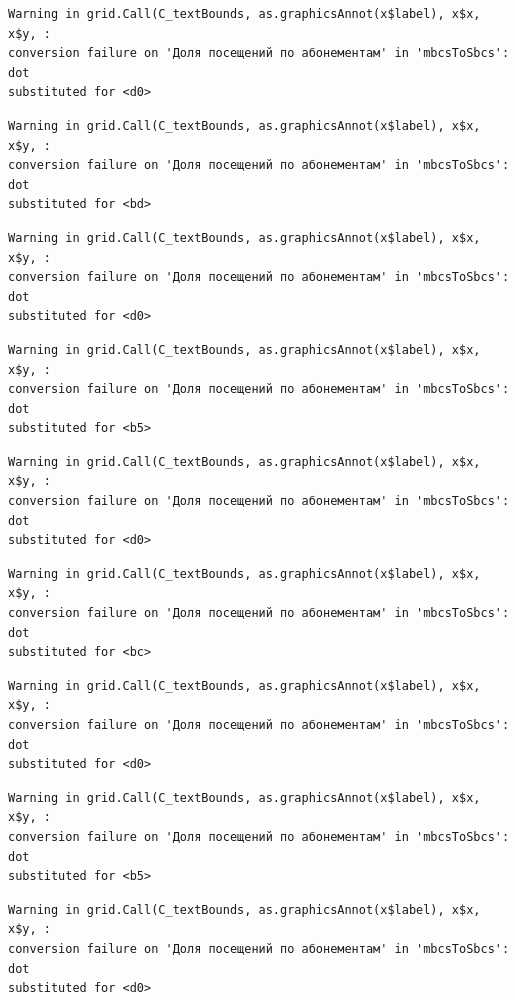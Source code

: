 \documentclass[
  letterpaper,
  DIV=11,
  numbers=noendperiod]{scrartcl}
\begin{document}
\begin{verbatim}
Warning in grid.Call(C_textBounds, as.graphicsAnnot(x$label), x$x, x$y, :
conversion failure on 'Доля посещений по абонементам' in 'mbcsToSbcs': dot
substituted for <d0>
\end{verbatim}

\begin{verbatim}
Warning in grid.Call(C_textBounds, as.graphicsAnnot(x$label), x$x, x$y, :
conversion failure on 'Доля посещений по абонементам' in 'mbcsToSbcs': dot
substituted for <bd>
\end{verbatim}

\begin{verbatim}
Warning in grid.Call(C_textBounds, as.graphicsAnnot(x$label), x$x, x$y, :
conversion failure on 'Доля посещений по абонементам' in 'mbcsToSbcs': dot
substituted for <d0>
\end{verbatim}

\begin{verbatim}
Warning in grid.Call(C_textBounds, as.graphicsAnnot(x$label), x$x, x$y, :
conversion failure on 'Доля посещений по абонементам' in 'mbcsToSbcs': dot
substituted for <b5>
\end{verbatim}

\begin{verbatim}
Warning in grid.Call(C_textBounds, as.graphicsAnnot(x$label), x$x, x$y, :
conversion failure on 'Доля посещений по абонементам' in 'mbcsToSbcs': dot
substituted for <d0>
\end{verbatim}

\begin{verbatim}
Warning in grid.Call(C_textBounds, as.graphicsAnnot(x$label), x$x, x$y, :
conversion failure on 'Доля посещений по абонементам' in 'mbcsToSbcs': dot
substituted for <bc>
\end{verbatim}

\begin{verbatim}
Warning in grid.Call(C_textBounds, as.graphicsAnnot(x$label), x$x, x$y, :
conversion failure on 'Доля посещений по абонементам' in 'mbcsToSbcs': dot
substituted for <d0>
\end{verbatim}

\begin{verbatim}
Warning in grid.Call(C_textBounds, as.graphicsAnnot(x$label), x$x, x$y, :
conversion failure on 'Доля посещений по абонементам' in 'mbcsToSbcs': dot
substituted for <b5>
\end{verbatim}

\begin{verbatim}
Warning in grid.Call(C_textBounds, as.graphicsAnnot(x$label), x$x, x$y, :
conversion failure on 'Доля посещений по абонементам' in 'mbcsToSbcs': dot
substituted for <d0>
\end{verbatim}
\end{document}
